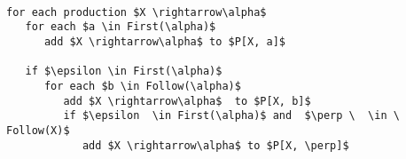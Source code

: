 \documentclass[
    border=0.2cm,
    convert={density=600}
]{standalone}
\begin{document}
\begin{lstlisting}[mathescape,backgroundcolor=\color{lightgray},basicstyle=\scriptsize\ttfamily]

for each production $X \rightarrow\alpha$
   for each $a \in First(\alpha)$
      add $X \rightarrow\alpha$ to $P[X, a]$
   
   if $\epsilon \in First(\alpha)$
      for each $b \in Follow(\alpha)$
         add $X \rightarrow\alpha$  to $P[X, b]$
         if $\epsilon  \in First(\alpha)$ and  $\perp \  \in \ Follow(X)$
            add $X \rightarrow\alpha$ to $P[X, \perp]$            
            
\end{lstlisting}
\end{document}
